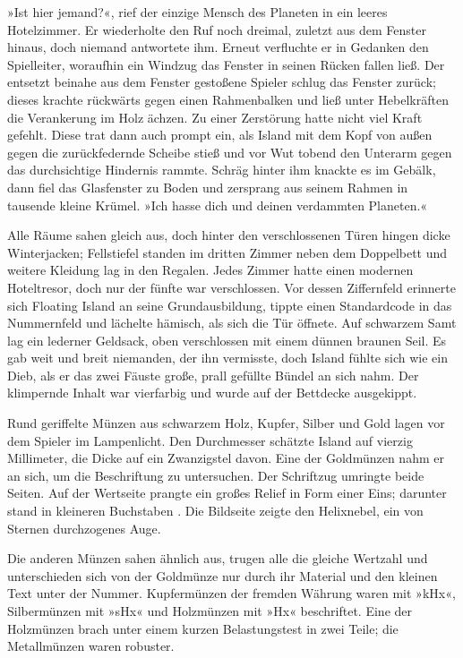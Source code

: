»Ist hier jemand?«, rief der einzige Mensch des Planeten in ein leeres Hotelzimmer. Er wiederholte den Ruf noch dreimal, zuletzt aus dem Fenster hinaus, doch niemand antwortete ihm. Erneut verfluchte er in Gedanken den Spielleiter, woraufhin ein Windzug das Fenster in seinen Rücken fallen ließ. Der entsetzt beinahe aus dem Fenster gestoßene Spieler schlug das Fenster zurück; dieses krachte rückwärts gegen einen Rahmenbalken und ließ unter Hebelkräften die Verankerung im Holz ächzen. Zu einer Zerstörung hatte nicht viel Kraft gefehlt. Diese trat dann auch prompt ein, als Island mit dem Kopf von außen gegen die zurückfedernde Scheibe stieß und vor Wut tobend den Unterarm gegen das durchsichtige Hindernis rammte. Schräg hinter ihm knackte es im Gebälk, dann fiel das Glasfenster zu Boden und zersprang aus seinem Rahmen in tausende kleine Krümel. »Ich hasse dich und deinen verdammten Planeten.«

Alle Räume sahen gleich aus, doch hinter den verschlossenen Türen hingen dicke Winterjacken; Fellstiefel standen im dritten Zimmer neben dem Doppelbett und weitere Kleidung lag in den Regalen. Jedes Zimmer hatte einen modernen Hoteltresor, doch nur der fünfte war verschlossen. Vor dessen Ziffernfeld erinnerte sich Floating Island an seine Grundausbildung, tippte einen Standardcode in das Nummernfeld und lächelte hämisch, als sich die Tür öffnete. Auf schwarzem Samt lag ein lederner Geldsack, oben verschlossen mit einem dünnen braunen Seil. Es gab weit und breit niemanden, der ihn vermisste, doch Island fühlte sich wie ein Dieb, als er das zwei Fäuste große, prall gefüllte Bündel an sich nahm. Der klimpernde Inhalt war vierfarbig und wurde auf der Bettdecke ausgekippt.

Rund geriffelte Münzen aus schwarzem Holz, Kupfer, Silber und Gold lagen vor dem Spieler im Lampenlicht. Den Durchmesser schätzte Island auf vierzig Millimeter, die Dicke auf ein Zwanzigstel davon. Eine der Goldmünzen nahm er an sich, um die Beschriftung zu untersuchen. Der Schriftzug  umringte beide Seiten. Auf der Wertseite prangte ein großes Relief in Form einer Eins; darunter stand in kleineren Buchstaben . Die Bildseite zeigte den Helixnebel, ein von Sternen durchzogenes Auge.

Die anderen Münzen sahen ähnlich aus, trugen alle die gleiche Wertzahl und unterschieden sich von der Goldmünze nur durch ihr Material und den kleinen Text unter der Nummer. Kupfermünzen der fremden Währung waren mit »kHx«, Silbermünzen mit »sHx« und Holzmünzen mit »Hx« beschriftet. Eine der Holzmünzen brach unter einem kurzen Belastungstest in zwei Teile; die Metallmünzen waren robuster.

